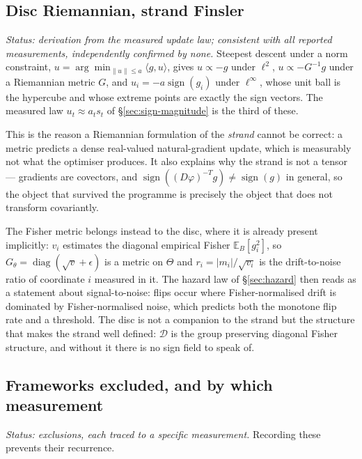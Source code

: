 \subsection{Disc Riemannian, strand Finsler}
\label{sec:finsler}

\emph{Status: derivation from the measured update law; consistent with all
reported measurements, independently confirmed by none.} Steepest descent under
a norm constraint,
$u=\arg\min_{\|u\|\le a}\langle g,u\rangle$, gives $u\propto -g$ under
$\ell^2$, $u\propto -G^{-1}g$ under a Riemannian metric $G$, and
$u_i=-a\operatorname{sign}(g_i)$ under $\ell^\infty$, whose unit ball is the
hypercube and whose extreme points are exactly the sign vectors. The measured
law $u_t\approx a_t s_t$ of \S\ref{sec:sign-magnitude} is the third of these.

This is the reason a Riemannian formulation of the \emph{strand} cannot be
correct: a metric predicts a dense real-valued natural-gradient update, which is
measurably not what the optimiser produces. It also explains why the strand is
not a tensor --- gradients are covectors, and
$\operatorname{sign}((D\varphi)^{-T}g)\ne\operatorname{sign}(g)$ in general, so
the object that survived the programme is precisely the object that does not
transform covariantly.

The Fisher metric belongs instead to the disc, where it is already present
implicitly: $v_i$ estimates the diagonal empirical Fisher $\mathbb{E}_B[g_i^2]$,
so $G_\theta=\operatorname{diag}(\sqrt{v}+\epsilon)$ is a metric on $\Theta$
and $r_i=|m_i|/\sqrt{v_i}$ is the drift-to-noise ratio of coordinate $i$
measured in it. The hazard law of \S\ref{sec:hazard} then reads as a statement
about signal-to-noise: flips occur where Fisher-normalised drift is dominated
by Fisher-normalised noise, which predicts both the monotone flip rate and a
threshold. The disc is not a companion to the strand but the structure that
makes the strand well defined: $\mathcal{D}$ is the group preserving diagonal
Fisher structure, and without it there is no sign field to speak of.

\subsection{Frameworks excluded, and by which measurement}
\label{sec:excluded}

\emph{Status: exclusions, each traced to a specific measurement.} Recording
these prevents their recurrence.

